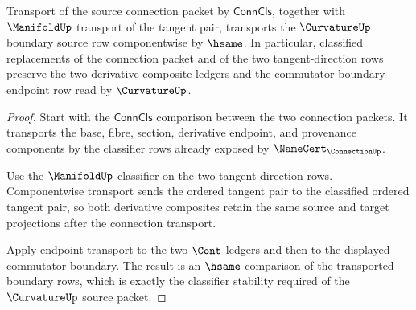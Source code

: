 \begin{theorem}
\label{thm:curvature-connection-classifier-stability}
Transport of the source connection packet by $\mathsf{ConnCls}$, together with $\ManifoldUp$ transport of the tangent pair, transports the $\CurvatureUp$ boundary source row componentwise by $\hsame$. In particular, classified replacements of the connection packet and of the two tangent-direction rows preserve the two derivative-composite ledgers and the commutator boundary endpoint row read by $\CurvatureUp$.
\end{theorem}
\begin{proof}
Start with the $\mathsf{ConnCls}$ comparison between the two connection packets. It transports the base, fibre, section, derivative endpoint, and provenance components by the classifier rows already exposed by $\NameCert_{\ConnectionUp}$.

Use the $\ManifoldUp$ classifier on the two tangent-direction rows. Componentwise transport sends the ordered tangent pair to the classified ordered tangent pair, so both derivative composites retain the same source and target projections after the connection transport.

Apply endpoint transport to the two $\Cont$ ledgers and then to the displayed commutator boundary. The result is an $\hsame$ comparison of the transported boundary rows, which is exactly the classifier stability required of the $\CurvatureUp$ source packet.
\end{proof}

